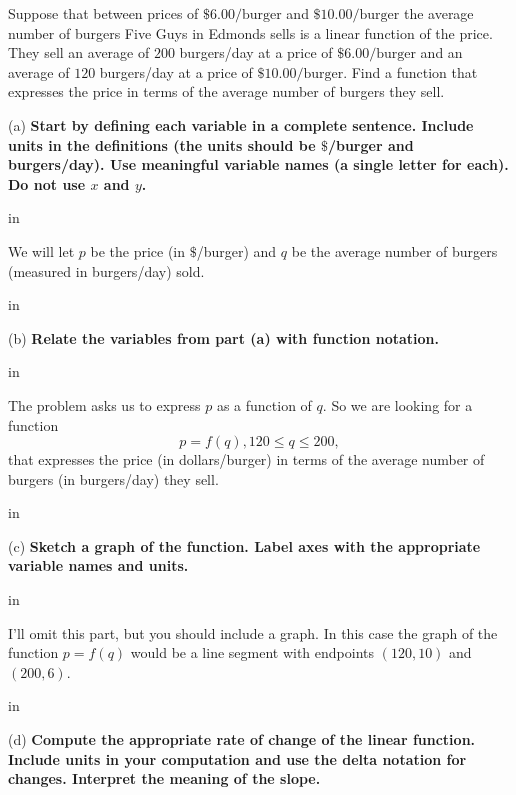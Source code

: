 \documentclass{ximera}
\newcommand{\pskip}{\vskip 0.1 in}
\begin{document}
\begin{example}  \label{Ex5:LF}
Suppose that between prices of $\$6.00/\text{burger}$ and $\$10.00/\text{burger}$ the average number of burgers Five Guys in Edmonds sells is a linear function of the price. They sell an average of $200$ burgers/day at a price of $\$6.00/\text{burger}$ and an average of $120$ burgers/day at a price of $\$10.00/\text{burger}$. Find a function that expresses the price in terms of the average number of burgers they sell.

\begin{explanation}
(a) {\bf Start by defining each variable in a complete sentence. Include units in the definitions (the units should be $\$$/burger and burgers/day). Use {\bf meaningful} variable names (a single letter for each). Do {\bf not} use $x$ and $y$.}

\pskip

We will let $p$ be the price (in $\$$/burger) and $q$ be the average number of burgers (measured in burgers/day) sold. %

\pskip

(b) {\bf Relate the variables from part (a) with function notation.} %

\pskip

The problem asks us to express $p$ as a function of $q$. So we are looking for a function
\[
   p = f(q) , 120 \leq q \leq 200 ,
\]
that expresses the price (in dollars/burger) in terms of the average number of burgers (in burgers/day) they sell.

\pskip



(c) {\bf Sketch a graph of the function. Label axes with the appropriate variable names and units.}

\pskip 

I'll omit this part, but you should include a graph. In this case the graph of the function $p=f(q)$ would be a line  segment with endpoints $(120, 10)$ and $(200, 6)$.

\pskip

(d) {\bf Compute the appropriate rate of change of the linear function. Include units in your computation and use the delta notation for changes. Interpret the meaning of the slope.}


\end{explanation}
\end{example}
\end{document}
